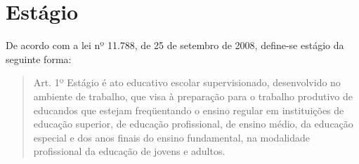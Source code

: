 \section{Estágio}
De acordo com a lei nº 11.788, de 25 de setembro de 2008, define-se estágio da seguinte forma:

\begin{quote}
	Art. 1º  Estágio é ato educativo escolar supervisionado, desenvolvido no ambiente de trabalho, que visa à preparação para o trabalho produtivo de educandos que estejam freqüentando o ensino regular em instituições de educação superior, de educação profissional, de ensino médio, da educação especial e dos anos finais do ensino fundamental, na modalidade profissional da educação de jovens e adultos. \cite{leiestagio}
\end{quote}